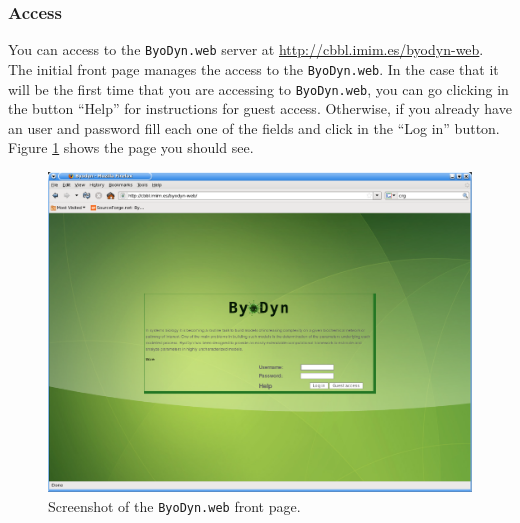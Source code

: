 \documentclass[a4paper, 11pt]{article}
\begin{document}
  \subsubsection{Access}
  You can access to the \texttt{ByoDyn.web} server at \url{http://cbbl.imim.es/byodyn-web}. 
  The initial front page manages the access to the \texttt{ByoDyn.web}. 
  In the case that it will be the first time that you are accessing to \texttt{ByoDyn.web}, you can go clicking in the button ``Help'' for instructions for guest access. 
  Otherwise, if you already have an user and password fill each one of the fields and click in the ``Log in'' button. 
  Figure \ref{frontPage} shows the page you should see.
  \begin{figure}[ht!]
    \begin{center}
      \includegraphics[scale=0.35]{figures/screenShots/frontPage.eps}
      \caption{
        Screenshot of the \texttt{ByoDyn.web} front page.
      }
      \label{frontPage}
    \end{center}
  \end{figure}
\end{document}
